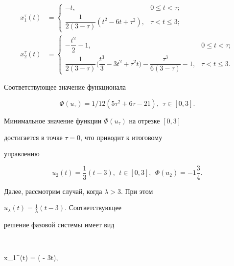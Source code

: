 \begin{align*}


x_{1}^{\tau}(t) &=


\begin{cases}


- t, & 0 \leq t < \tau;\\[3mm]


\dfrac{1}{2(3 - \tau)}(t^{2} - 6t + \tau^{2}), & \tau < t \leq 3;


\end{cases}


\\


x_{2}^{\tau}(t) &=


\begin{cases}


- \dfrac{t^{2}}{2} - 1, & 0 \leq t < \tau; \\[3mm]


\dfrac{1}{2(3 - \tau)}\bigg(\dfrac{t^{3}}{3} - 3t^{2} + \tau^{2}t\bigg) -


\dfrac{\tau^{3}}{6(3 - \tau)} - 1, & \tau < t \leq 3.


\end{cases}


\end{align*}


Соответствующее значение функционала


$$


\Phi(u_{\tau}) = 1/12 (5\tau^{2} + 6\tau - 21),\ \ \tau \in [0, 3].


$$


Минимальное значение функции $\Phi(u_{\tau})$ на отрезке $[0, 3]$


достигается в точке $\tau= 0$, что приводит к итоговому


управлению


$$


u_{2}(t) = \frac{1}{3}(t - 3),\ \ t \in [0, 3],


\ \ \Phi(u_{2}) = - 1 \frac{3}{4}.


$$





Далее, рассмотрим случай, когда $\lambda > 3$. При этом


$u_{\lambda}(t) = \frac{1}{\lambda}(t - 3)$. Соответствующее


решение фазовой системы имеет вид


$$


x_{1}^{\lambda}(t) = \bigg( - 3t\bigg),


